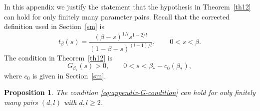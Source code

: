\documentclass[11pt]{amsart}
\theoremstyle{plain}
\newtheorem{proposition}[theorem]{Proposition}
\numberwithin{equation}{section}
\numberwithin{theorem}{section}
\numberwithin{figure}{section}
\begin{document}
In this appendix we justify the statement that the hypothesis in Theorem~\ref{th12} can
hold for only finitely many parameter pairs.  Recall that the corrected definition used in
Section~\ref{sm} is
\[
  t_\beta(s)=\frac{(\beta-s)^{1/l}s^{1-2/l}}{(1-\beta-s)^{(l-1)/l}},
  \qquad 0<s<\beta .
\]
The condition in Theorem~\ref{th12} is
\begin{equation}
  G_{\beta_*}(s)>0,\qquad 0<s<\beta_*-c_0(\beta_*),
\label{eq:appendix-G-condition}
\end{equation}
where \(c_0\) is given in Section~\ref{sm}.

\begin{proposition}\label{prop:finite-G-condition}
The condition \eqref{eq:appendix-G-condition} can hold for only finitely many pairs
\((d,l)\) with \(d,l\ge2\).
\end{proposition}
\end{document}
